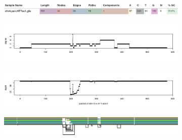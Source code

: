 \begin{figure}[h!]
	\begin{subfigure}{\linewidth}
		\caption{}
		\centering
		\includegraphics[width=1.0\linewidth, trim=-1.25cm 3cm 0 1.75cm]{fig/metrics/chr4_pan_HTTex1_gfa_multiqc_odgi_stats}
		\label{fig:metrics-multiqc}
	\end{subfigure}
	\begin{subfigure}{1\linewidth}
	\caption{}
	\centering
	\includegraphics[width=\linewidth,trim=+.225cm 3cm +.425cm +3cm]{fig/metrics/chr4_HTT_chm13_degree_w1_bed}
	\label{fig:metrics-degree}
	\end{subfigure}
	\begin{subfigure}{\linewidth}
	\caption{}
	\centering
	\includegraphics[width=\linewidth,trim=+.225cm 3cm +0.425cm +3cm]{fig/metrics/chr4_HTT_chm13_depth_w1_bed}
	\label{fig:metrics-depth}
	\end{subfigure}
	\begin{subfigure}{\linewidth}
		\caption{}
		\centering
		\includegraphics[width=1.0\linewidth, trim=-1.5cm 0.75cm -0.8cm 0.5cm]{fig/metrics/chr4_pan_fa_a2fb268_e820cd3_9ea71d8_smooth_gfa_og_HTTex1_og_O_og_tiny_og_png_svg}
		\label{fig:metrics-viz}
	\end{subfigure}

\end{figure}
